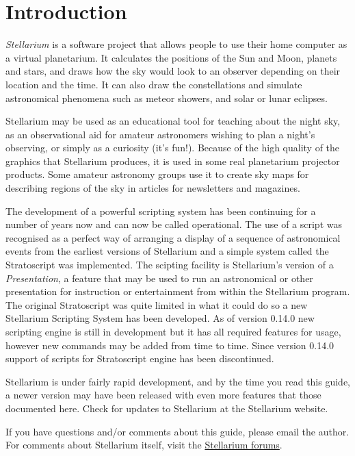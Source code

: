 

\chapter{Introduction}

\emph{Stellarium} is a software project that allows people to use their
home computer as a virtual planetarium. It calculates the positions of
the Sun and Moon, planets and stars, and draws how the sky would look to
an observer depending on their location and the time. It can also draw
the constellations and simulate astronomical phenomena such as meteor
showers, and solar or lunar eclipses.

Stellarium may be used as an educational tool for teaching about the
night sky, as an observational aid for amateur astronomers wishing to
plan a night's observing, or simply as a curiosity (it's fun!). Because
of the high quality of the graphics that Stellarium produces, it is used
in some real planetarium projector products. Some amateur astronomy
groups use it to create sky maps for describing regions of the sky in
articles for newsletters and magazines.

The development of a powerful scripting system has been continuing for a
number of years now and can now be called operational. The use of a
script was recognised as a perfect way of arranging a display of a
sequence of astronomical events from the earliest versions of Stellarium
and a simple system called the Stratoscript was implemented. The
scipting facility is Stellarium's version of a \emph{Presentation}, a
feature that may be used to run an astronomical or other presentation
for instruction or entertainment from within the Stellarium program. The
original Stratoscript was quite limited in what it could do so a new
Stellarium Scripting System has been developed. As of version 0.14.0 new scripting engine is still in development but it has all required features for usage, however new commands may be added from time to time. Since version 0.14.0 support of scripts for Stratoscript engine has been discontinued.

Stellarium is under fairly rapid development, and by the time you read
this guide, a newer version may have been released with even more
features that those documented here. Check for updates to Stellarium at
the Stellarium website.

If you have questions and/or comments about this guide, please email the
author. For comments about Stellarium itself, visit the
\href{https://sourceforge.net/p/stellarium/discussion/278769/}{Stellarium
forums}.
